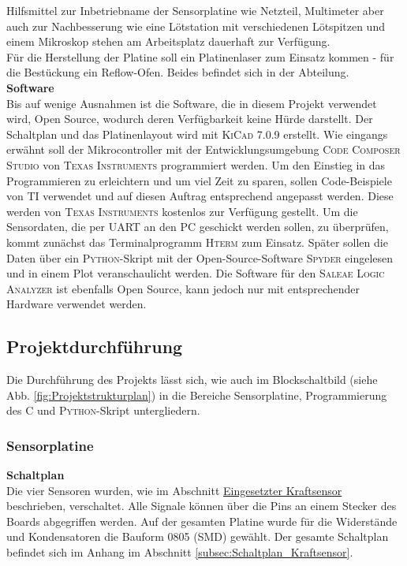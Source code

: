 \documentclass[
	letterpaper, %
	10pt, %
]{CSUniSchoolLabReport}
\begin{document}
\begin{spacing}{1.6}
Hilfsmittel zur Inbetriebname der Sensorplatine wie Netzteil, Multimeter aber auch zur Nachbesserung wie eine Lötstation mit verschiedenen Lötspitzen und einem Mikroskop stehen am Arbeitsplatz dauerhaft zur Verfügung.\\
Für die Herstellung der Platine soll ein Platinenlaser zum Einsatz kommen - für die Bestückung ein Reflow-Ofen. Beides befindet sich in der Abteilung.\\

\textbf{Software\\}
Bis auf wenige Ausnahmen ist die Software, die in diesem Projekt verwendet wird, Open Source, wodurch deren Verfügbarkeit keine Hürde darstellt. Der Schaltplan und das Platinenlayout wird mit \textsc{KiCad 7.0.9} erstellt. Wie eingangs erwähnt soll der Mikrocontroller mit der Entwicklungsumgebung \textsc{Code Composer Studio} von \textsc{Texas Instruments} programmiert werden. Um den Einstieg in das Programmieren zu erleichtern und um viel Zeit zu sparen, sollen Code-Beispiele von \textsc{TI} verwendet und auf diesen Auftrag entsprechend angepasst werden. Diese werden von \textsc{Texas Instruments} kostenlos zur Verfügung gestellt. Um die Sensordaten, die per UART an den PC geschickt werden sollen, zu überprüfen, kommt zunächst das Terminalprogramm \textsc{Hterm} zum Einsatz. Später sollen die Daten über ein \textsc{Python}-Skript mit der Open-Source-Software \textsc{Spyder} eingelesen und in einem Plot veranschaulicht werden. Die Software für den \textsc{Saleae Logic Analyzer} ist ebenfalls Open Source, kann jedoch nur mit entsprechender Hardware verwendet werden.\\

\subsection{Projektdurchführung}
Die Durchführung des Projekts lässt sich, wie auch im Blockschaltbild (siehe Abb. \ref{fig:Projektstrukturplan}) in die Bereiche Sensorplatine, Programmierung des \textmu C und \textsc{Python}-Skript untergliedern.\\

\subsubsection{Sensorplatine}
\textbf{Schaltplan\\}
Die vier Sensoren wurden, wie im Abschnitt \hyperref[subsec:Eingesetzter Kraftsensor]{\glqq Eingesetzter Kraftsensor\grqq} beschrieben, verschaltet. Alle Signale können über die Pins an einem Stecker des Boards abgegriffen werden. Auf der gesamten Platine wurde für die Widerstände und Kondensatoren die Bauform 0805 (SMD) gewählt. Der gesamte Schaltplan befindet sich im Anhang im Abschnitt \ref{subsec:Schaltplan_Kraftsensor}.\\


\end{spacing}
\end{document}
